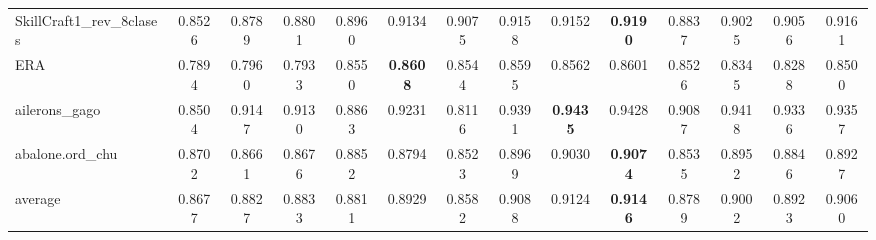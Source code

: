 \begin{tabular}{lccccccccccccc}
SkillCraft1_rev_8clases & 0.8526 & 0.8789 & 0.8801 & 0.8960 & 0.9134 & 0.9075 & 0.9158 & 0.9152 & \textbf{0.9190} & 0.8837 & 0.9025 & 0.9056 & 0.9161 \\
ERA & 0.7894 & 0.7960 & 0.7933 & 0.8550 & \textbf{0.8608} & 0.8544 & 0.8595 & 0.8562 & 0.8601 & 0.8526 & 0.8345 & 0.8288 & 0.8500 \\
ailerons_gago & 0.8504 & 0.9147 & 0.9130 & 0.8863 & 0.9231 & 0.8116 & 0.9391 & \textbf{0.9435} & 0.9428 & 0.9087 & 0.9418 & 0.9336 & 0.9357 \\
abalone.ord_chu & 0.8702 & 0.8661 & 0.8676 & 0.8852 & 0.8794 & 0.8523 & 0.8969 & 0.9030 & \textbf{0.9074} & 0.8535 & 0.8952 & 0.8846 & 0.8927 \\
average & 0.8677 & 0.8827 & 0.8833 & 0.8811 & 0.8929 & 0.8582 & 0.9088 & 0.9124 & \textbf{0.9146} & 0.8789 & 0.9002 & 0.8923 & 0.9060 \\
\bottomrule
\end{tabular}
